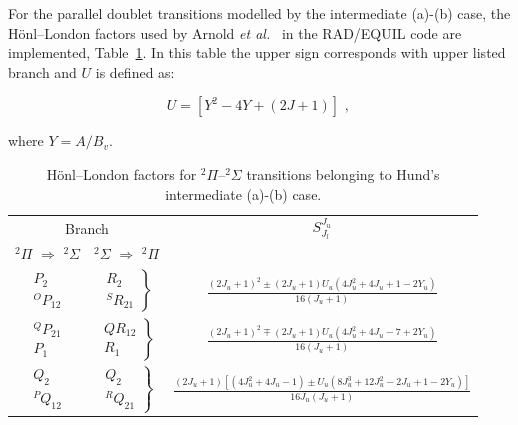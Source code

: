 For the parallel doublet transitions modelled by the intermediate (a)-(b) case, the H\"{o}nl--London factors used by Arnold \textit{et al.}~\cite{Arn69} in the RAD/EQUIL code are implemented, Table~\ref{tab:HundAB_HLF}.
In this table the upper sign corresponds with upper listed branch and $U$ is defined as:

\begin{equation}
 U = \left [ Y^2 - 4 Y + ( 2 J + 1 ) \right ] \text{ , }
\end{equation}

\noindent where  $Y = A / B_v$.
 
\begin{table}[h]
 \center
 \caption{H\"{o}nl--London factors for $^2\Pi$--$^2\Sigma$ transitions belonging to Hund's intermediate (a)-(b) case.}
 \label{tab:HundAB_HLF}
 \begin{tabular*}{0.7\textwidth}{ccc}
  \hline \multicolumn{2}{c}{Branch}                                                                                                                                                                     & $S^{J_u}_{J_l}$ \\
              $^2\Pi$ $\Rightarrow$ $^2\Sigma$                      &           $^2\Sigma$ $\Rightarrow$ $^2\Pi$                                                   & \\
  \hline  $\begin{array}{c} P_2 \\ ^OP_{1 2} \end{array}$ & $\left . \begin{array}{c} R_2 \\ ^S R_{2 1} \end{array} \right \rbrace$     & $\frac{(2 J_u + 1)^2 \pm (2 J_u + 1 ) U_u ( 4 J_u^2 + 4 J_u + 1 - 2Y_u )}{16 ( J_u +1 )}$ \\ 
              $\begin{array}{c} ^Q P_{2 1} \\ P_1 \end{array}$ & $\left . \begin{array}{c} Q R_{1 2} \\ R_1 \end{array} \right \rbrace$     & $\frac{(2 J_u + 1)^2 \mp (2 J_u + 1 ) U_u ( 4 J_u^2 + 4 J_u -7 + 2Y_u )}{16 ( J_u +1 )}$ \\
              $\begin{array}{c} Q_2 \\ ^P Q_{1 2} \end{array}$ & $\left . \begin{array}{c} Q_2 \\ ^R Q_{2 1} \end{array} \right \rbrace$   & $\frac{(2 J_u + 1) \left [ ( 4 J_u^2 + 4 J_u - 1 ) \pm U_u ( 8 J_u^3 + 12 J_u ^2 - 2 J_u + 1 - 2 Y_u ) \right ]}{16 J_u ( J_u +1 )}$ \\ 

\end{tabular*}
\end{table}
